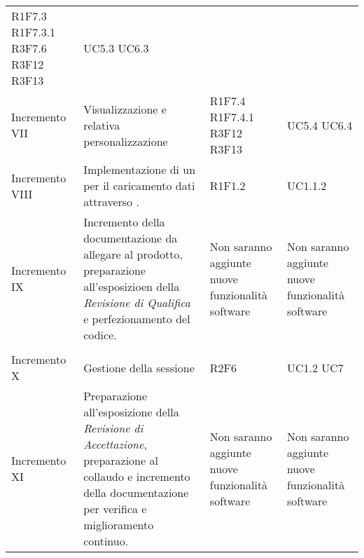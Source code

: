 \begin{longtable}{C{3cm} C{7cm} C{2cm} C{2cm}}
R1F7.3 \newline R1F7.3.1 \newline R3F7.6 \newline R3F12 \newline R3F13& 
UC5.3 \newline UC6.3\\
Incremento VII & 
Visualizzazione  e relativa personalizzazione & 
R1F7.4 \newline R1F7.4.1 \newline R3F12 \newline R3F13& 
UC5.4 \newline UC6.4\\
Incremento VIII & 
Implementazione di un  per il caricamento dati attraverso . & 
R1F1.2 & 
UC1.1.2\\
Incremento IX &
Incremento della documentazione da allegare al prodotto, preparazione all'esposizioen della \textit{Revisione di Qualifica} e perfezionamento del codice.& 
Non saranno aggiunte nuove funzionalità software & 
Non saranno aggiunte nuove funzionalità software\\
\\
Incremento X & 
Gestione della sessione & 
R2F6 & 
UC1.2 \newline UC7\\
Incremento XI & 
Preparazione all'esposizione della \textit{Revisione di Accettazione}, preparazione al collaudo e incremento della documentazione per verifica e miglioramento continuo.& 
Non saranno aggiunte nuove funzionalità software & 
Non saranno aggiunte nuove funzionalità software\\

\end{longtable}
